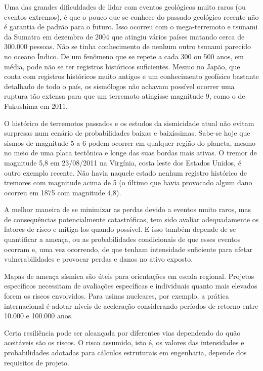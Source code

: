 \documentclass[jgrga]{agutex}
\begin{document}
\begin{article}
Uma das grandes dificuldades de lidar com eventos geológicos muito raros (ou eventos extremos), é que o pouco que se conhece do passado geológico recente não é garantia de padrão para o futuro. Isso ocorreu com o mega-terremoto e tsunami da Sumatra em dezembro de 2004 que atingiu vários países matando cerca de 300.000 pessoas. Não se tinha conhecimento de nenhum outro tsunami parecido no oceano Índico. De um fenômeno que se repete a cada 300 ou 500 anos, em média, pode não se ter registros históricos suficientes. Mesmo no Japão, que conta com registros históricos muito antigos e um conhecimento geofísico bastante detalhado de todo o país, os sismólogos não achavam possível ocorrer uma ruptura tão extensa para que um terremoto atingisse magnitude 9, como o de Fukushima em 2011.  

O histórico de terremotos passados e os estudos da sismicidade atual não evitam surpresas num cenário de probabilidades baixas e baixíssimas. Sabe-se hoje que sismos de magnitude 5 a 6 podem ocorrer em qualquer região do planeta, mesmo no meio de uma placa tectônica e longe das suas bordas mais ativas. O tremor de magnitude 5,8 em 23/08/2011 na Virgínia, costa leste dos Estados Unidos, é outro exemplo recente. Não havia naquele estado nenhum registro histórico de tremores com magnitude acima de 5 (o último que havia provocado algum dano ocorreu em 1875 com magnitude 4,8).  

A melhor maneira de se minimizar as perdas devido a eventos muito raros, mas de consequências potencialmente catastróficas, tem sido avaliar adequadamente os fatores de risco e mitiga-los quando possível. E isso também depende de se quantificar a ameaça, ou as probabilidades condicionais de que esses eventos ocorram e, uma vez ocorrendo, de que tenham intensidade suficiente para afetar vulnerabilidades e provocar perdas e danos no ativo exposto. 

Mapas de ameaça sísmica são úteis para orientações em escala regional. Projetos específicos necessitam de avaliações específicas e individuais quanto mais elevados forem os riscos envolvidos. Para usinas nucleares, por exemplo, a prática internacional é adotar níveis de aceleração considerando períodos de retorno entre 10.000 e 100.000 anos. 

Certa resiliência pode ser alcançada por diferentes vias dependendo do quão aceitáveis são os riscos. O risco assumido, isto é, os valores das intensidades e probabilidades adotadas para cálculos estruturais em engenharia, depende dos requisitos de projeto. 


\end{article}
\end{document}
